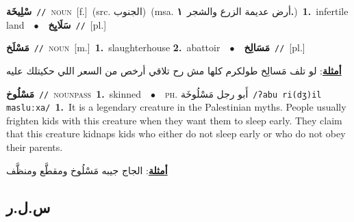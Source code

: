 \documentclass[10pt,a4paper,twoside]{article} %
\begin{document}
\begin{multicols}{2}
{\setlength\topsep{0pt}\textbf{\foreignlanguage{arabic}{سْلِيخَة}}\ {\color{gray}\texttt{//}\color{black}}\ \textsc{noun}\ [f.]\ (src. \color{gray}\foreignlanguage{arabic}{الجنوب}\color{black})\ \color{gray}(msa. \foreignlanguage{arabic}{أرض عديمة الزرع والشجر}~\foreignlanguage{arabic}{\textbf{١.}})\color{black}\ \textbf{1.}~infertile land\ \ $\bullet$\ \ \setlength\topsep{0pt}\textbf{\foreignlanguage{arabic}{سَلَايِخ}}\ {\color{gray}\texttt{//}\color{black}}\ [pl.]\ } \vspace{2mm}

{\setlength\topsep{0pt}\textbf{\foreignlanguage{arabic}{مَسْلَخ}}\ {\color{gray}\texttt{//}\color{black}}\ \textsc{noun}\ [m.]\ \textbf{1.}~slaughterhouse  \textbf{2.}~abattoir\ \ $\bullet$\ \ \setlength\topsep{0pt}\textbf{\foreignlanguage{arabic}{مَسَالِخ}}\ {\color{gray}\texttt{//}\color{black}}\ [pl.]\  \begin{flushright}\color{gray}\foreignlanguage{arabic}{\textbf{\underline{\foreignlanguage{arabic}{أمثلة}}}: لو تلف مَسالِخ طولكرم كلها مش رح تلاقي أرخص من السعر اللي حكيتلك عليه}\end{flushright}\color{black}} \vspace{2mm}

{\setlength\topsep{0pt}\textbf{\foreignlanguage{arabic}{مَسْلُوخ}}\ {\color{gray}\texttt{//}\color{black}}\ \textsc{noun\textunderscore pass}\ \textbf{1.}~skinned\ \ $\bullet$\ \ \textsc{ph.} \color{gray} \foreignlanguage{arabic}{أَبو رجل مَسْلُوخَة}\color{black}\ {\color{gray}\texttt{/{\sffamily ʔabu ri(dʒ)il masluːxa}/}\color{black}}\ \textbf{1.}~It is a legendary creature in the Palestinian myths. People usually frighten kids with this creature when they want them to sleep early. They claim that this creature kidnaps kids who either do not sleep early or who do not obey their parents.\  \begin{flushright}\color{gray}\foreignlanguage{arabic}{\textbf{\underline{\foreignlanguage{arabic}{أمثلة}}}: الجاج جيبه مَسْلُوخ ومقطَّع ومنظَّف}\end{flushright}\color{black}} \vspace{2mm}

\vspace{-3mm}
\subsection*{\color{blue}\foreignlanguage{arabic}{س.ل.ر}\color{blue}{ (ntws)}} 


\end{multicols}
\end{document}
